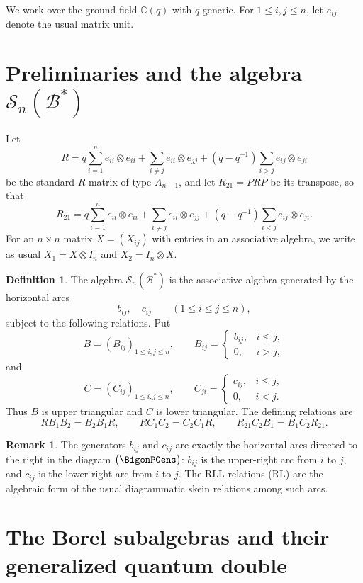 \documentclass{article}
\theoremstyle{definition}
\newtheorem{definition}{Definition}
\newtheorem{remark}{Remark}
\newcommand{\bcS}{\mathcal{S}}
\newcommand{\fB}{\mathcal{B}}
\newcommand{\q}{q}
\begin{document}
\noindent
We work over the ground field $\mathbb C(q)$ with $q$ generic.  
For $1\leq i,j\leq n$, let $e_{ij}$ denote the usual matrix unit.

\section{Preliminaries and the algebra $\bcS_n(\fB^*)$}

Let
\[
R=\q\sum_{i=1}^n e_{ii}\otimes e_{ii}
+\sum_{i\neq j}e_{ii}\otimes e_{jj}
+(\q-\q^{-1})\sum_{i>j}e_{ij}\otimes e_{ji}
\]
be the standard $R$-matrix of type $A_{n-1}$, and let
$R_{21}=P R P$ be its transpose, so that
\[
R_{21}=\q\sum_{i=1}^n e_{ii}\otimes e_{ii}
+\sum_{i\neq j}e_{ii}\otimes e_{jj}
+(\q-\q^{-1})\sum_{i<j}e_{ij}\otimes e_{ji}.
\]
For an $n\times n$ matrix $X=(X_{ij})$ with entries in an associative
algebra, we write as usual
$X_1=X\otimes I_n$ and $X_2=I_n\otimes X$.

\begin{definition}
The algebra $\bcS_n(\fB^*)$ is the associative algebra generated by
the horizontal arcs
\[
b_{ij},\quad c_{ij}\qquad (1\leq i\leq j\leq n),
\]
subject to the following relations. Put
\[
B=(B_{ij})_{1\leq i,j\leq n},\qquad
B_{ij}=
\begin{cases}
b_{ij},& i\leq j,\\
0,& i>j,
\end{cases}
\]
and
\[
C=(C_{ij})_{1\leq i,j\leq n},\qquad
C_{ji}=
\begin{cases}
c_{ij},& i\leq j,\\
0,& i<j.
\end{cases}
\]
Thus $B$ is upper triangular and $C$ is lower triangular. The defining
relations are
\begin{equation}
  R B_1 B_2 = B_2 B_1 R,\qquad
  R C_1 C_2 = C_2 C_1 R,\qquad
  R_{21} C_2 B_1 = B_1 C_2 R_{21}.
  \tag{RL}
\end{equation}
\end{definition}

\begin{remark}
The generators $b_{ij}$ and $c_{ij}$ are exactly the horizontal arcs
directed to the right in the diagram $\bigl(\BigonPGens\bigr)$:
$b_{ij}$ is the upper-right arc from $i$ to $j$, and $c_{ij}$ is the
lower-right arc from $i$ to $j$. The RLL relations (RL) are the
algebraic form of the usual diagrammatic skein relations among such
arcs.
\end{remark}

\section{The Borel subalgebras and their generalized quantum double}
\end{document}

